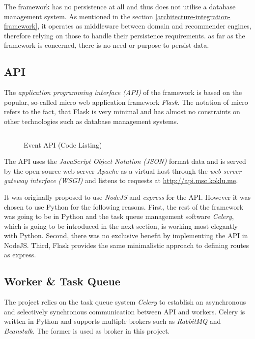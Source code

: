 The framework has no persistence at all and thus does not utilise a database management system. As mentioned in the section \ref{architecture-integration-framework}, it operates as middleware between domain and recommender engines, therefore relying on those to handle their persistence requirements. as far as the framework is concerned, there is no need or purpose to persist data.

\subsection{API}

The \emph{application programming interface (API)} of the framework is based on the popular, so-called micro web application framework \emph{Flask}. The notation of micro refers to the fact, that Flask is very minimal and has almost no constraints on other technologies such as database management systems.

\begin{figure}[ht]
    \inputminted{py}{./includes/source/framework/api/event.py}
    \caption{Event API (Code Listing)}
    \label{fig:implementation-framework-api-event}
\end{figure}

The API uses the \emph{JavaScript Object Notation (JSON)} format data and is served by the open-source web server \emph{Apache} as a virtual host through the \emph{web server gateway interface (WSGI)} and listens to requests at \url{http://api.msc.koklu.me}.

It was originally proposed to use \emph{NodeJS} and \emph{express} for the API. However it was chosen to use Python for the following reasons. First, the rest of the framework was going to be in Python and the task queue management software \emph{Celery}, which is going to be introduced in the next section, is working most elegantly with Python. Second, there was no exclusive benefit by implementing the API in NodeJS. Third, Flask provides the same minimalistic approach to defining routes as express.

\subsection{Worker \& Task Queue}

The project relies on the task queue system \emph{Celery} to establish an asynchronous and selectively synchronous communication between API and workers. Celery is written in Python and supports multiple brokers such as \emph{RabbitMQ} and \emph{Beanstalk}. The former is used as broker in this project.

